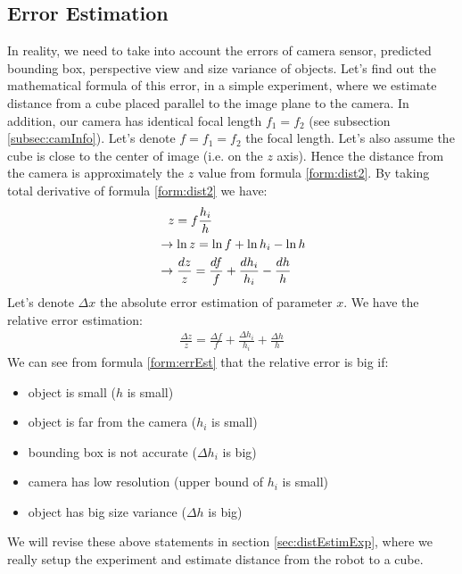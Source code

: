 \subsection{Error Estimation}
In reality, we need to take into account the errors of camera sensor, predicted bounding box, perspective view and size variance of objects. Let's find out the mathematical formula of this error, in a simple experiment, where we estimate distance from a cube placed parallel to the image plane to the camera. In addition, our camera has identical focal length $f_1 = f_2$ (see subsection \ref{subsec:camInfo}). Let's denote $f = f_1 = f_2$ the focal length. Let's also assume the cube is close to the center of image (i.e. on the $z$ axis). Hence the distance from the camera is approximately the $z$ value from formula \ref{form:dist2}. By taking total derivative of formula \ref{form:dist2} we have:
\begin{align*}
& \hspace{0.3cm} z = f \frac{h_i}{h} \\
&\rightarrow \ln z = \ln f + \ln h_i - \ln h \\
&\rightarrow \frac{d z}{z} = \frac{d f}{f} + \frac{d h_i}{h_i} - \frac{d h}{h}
\end{align*}
Let's denote $\Delta x$ the absolute error estimation of parameter $x$. We have the relative error estimation:
\begin{align}
\frac{\Delta z}{z} =  \frac{\Delta f}{f} + \frac{\Delta h_i}{h_i} + \frac{\Delta h}{h}
\label{form:errEst}
\end{align}
We can see from formula \ref{form:errEst} that the relative error is big if: 
\begin{itemize}
	\item object is small ($h$ is small)
	\item object is far from the camera ($h_i$ is small)
	\item bounding box is not accurate ($\Delta h_i$ is big)
	\item camera has low resolution (upper bound of $h_i$ is small)
	\item object has big size variance ($\Delta h$ is big)
\end{itemize}
We will revise these above statements in section \ref{sec:distEstimExp}, where we really setup the experiment and estimate distance from the robot to a cube.

